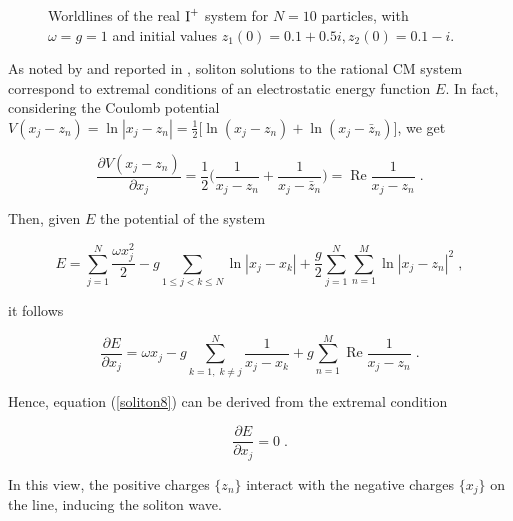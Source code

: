 \begin{figure}[H]
    \centering
    \caption{Worldlines of the real $\textnormal{I}^+$ system for $N = 10$ particles, with $\omega = g = 1$ and initial values $z_1(0) = 0.1 + 0.5i, z_2(0) = 0.1 - i$.}
    \label{figsoliton10}
\end{figure}

\begin{obs}
As noted by \cite{abanov2011} and reported in \cite{kulkarni2017, philip2019soliton}, soliton solutions to the rational CM system correspond to extremal conditions of an electrostatic energy function $E$. In fact, considering the Coulomb potential $V(x_j - z_n) = \ln{|x_j - z_n|} = \frac{1}{2}\big[\ln{(x_j - z_n)} + \ln{(x_j - \bar z_n)}\big]$, we get

\begin{equation}
    \frac{\partial V(x_j - z_n)}{\partial x_j} = \frac{1}{2} \Big ( \frac{1}{x_j - z_n} + \frac{1}{x_j - \bar z_n} \Big ) = \operatorname{Re}{\frac{1}{x_j - z_n}}\;.
\end{equation}

Then, given $E$ the potential of the system

\begin{equation}
    E = \sum_{j=1}^N \frac{\omega x_j^2}{2} - g \sum_{1 \leq j < k \leq N} \ln{|x_j - x_k|} + \frac{g}{2} \sum_{j = 1}^N \sum_{n=1}^M \ln{|x_j - z_n|^2}\;,
\end{equation}

it follows

\begin{equation}
    \frac{\partial E}{\partial x_j} = \omega x_j - g \sum_{k=1,\;k \neq j}^N \frac{1}{x_j - x_k} + g\sum_{n=1}^M \operatorname{Re}{\frac{1}{x_j - z_n}}\;.
\end{equation}

Hence, equation (\ref{soliton8}) can be derived from the extremal condition 

\begin{equation}
    \frac{\partial E}{\partial x_j} = 0\;.
\end{equation}

In this view, the positive charges $\{z_n\}$ interact with the negative charges $\{x_j\}$ on the line, inducing the soliton wave. 
\end{obs}

